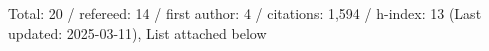 Total: 20 / refereed: 14 / first author: 4 / citations: 1,594 / h-index: 13 (Last updated: 2025-03-11), List attached below